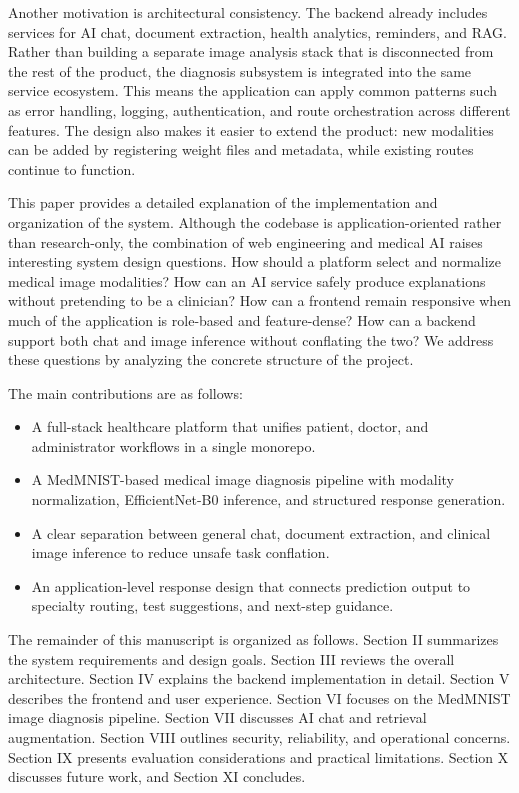 \documentclass[conference]{IEEEtran}
\begin{document}
Another motivation is architectural consistency. The backend already includes services for AI chat, document extraction, health analytics, reminders, and RAG. Rather than building a separate image analysis stack that is disconnected from the rest of the product, the diagnosis subsystem is integrated into the same service ecosystem. This means the application can apply common patterns such as error handling, logging, authentication, and route orchestration across different features. The design also makes it easier to extend the product: new modalities can be added by registering weight files and metadata, while existing routes continue to function.

This paper provides a detailed explanation of the implementation and organization of the system. Although the codebase is application-oriented rather than research-only, the combination of web engineering and medical AI raises interesting system design questions. How should a platform select and normalize medical image modalities? How can an AI service safely produce explanations without pretending to be a clinician? How can a frontend remain responsive when much of the application is role-based and feature-dense? How can a backend support both chat and image inference without conflating the two? We address these questions by analyzing the concrete structure of the project.

The main contributions are as follows:

\begin{itemize}[leftmargin=*,itemsep=2pt,topsep=4pt]
    \item A full-stack healthcare platform that unifies patient, doctor, and administrator workflows in a single monorepo.
    \item A MedMNIST-based medical image diagnosis pipeline with modality normalization, EfficientNet-B0 inference, and structured response generation.
    \item A clear separation between general chat, document extraction, and clinical image inference to reduce unsafe task conflation.
    \item An application-level response design that connects prediction output to specialty routing, test suggestions, and next-step guidance.
\end{itemize}

The remainder of this manuscript is organized as follows. Section II summarizes the system requirements and design goals. Section III reviews the overall architecture. Section IV explains the backend implementation in detail. Section V describes the frontend and user experience. Section VI focuses on the MedMNIST image diagnosis pipeline. Section VII discusses AI chat and retrieval augmentation. Section VIII outlines security, reliability, and operational concerns. Section IX presents evaluation considerations and practical limitations. Section X discusses future work, and Section XI concludes.
\end{document}
